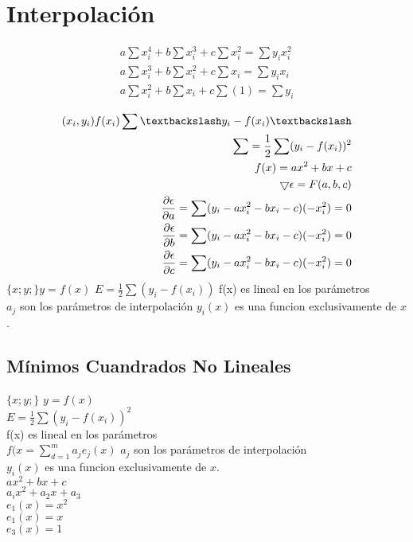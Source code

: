 \chapter{Interpolaci\'on}
\begin{eqnarray}
a\sum x_i^4 + b\sum x_i^3 + c\sum x_i^2 = \sum y_ix_i^2 \\
a\sum x_i^3 + b\sum x_i^2 + c\sum x_i = \sum y_ix_i\\ 
a\sum x_i^2 + b\sum x_i + c\sum(1) = \sum y_i
\end{eqnarray}

\begin{eqnarray}
(x_i , y_i) f(x_i) \sum \textbackslash y_i-f(x_i) \textbackslash \\
\sum = \frac{1}{2}\sum(y_i-f(x_i))^2\\
f(x) = ax^2+bx+c \\
\bigtriangledown \epsilon = F(a, b, c) \\
\frac{ \partial \epsilon}{\partial a} = \sum(y_i - ax_i^2 - bx_i - c)(-x_i^2) = 0\\
\frac{\partial \epsilon}{\partial b} = \sum(y_i - ax_i^2 - bx_i - c)(-x_i^2) = 0 \\
\frac{\partial \epsilon}{\partial c} = \sum(y_i - ax_i^2 - bx_i - c)(-x_i^2) = 0
\end{eqnarray} 
$\{x; y;\} y = f(x)$
$E=\frac{1}{2}\sum(y_i-f(x_i))$%
f(x) es lineal en los par\'ametros\\
$a_j$ son los par\'ametros de interpolaci\'on
$y_i(x)$ es una funcion exclusivamente de $x$.\\


\section{M\'inimos Cuandrados No Lineales}
\noindent $\{x; y;\}$ $y = f(x)$\\
$E=\frac{1}{2}\sum(y_i-f(x_i))^2$\\
f(x) es lineal en los par\'ametros\\
$f(x= \sum_{d=1}^{m}a_j e_j(x)$ %
$a_j$ son los par\'ametros de interpolaci\'on\\
$y_i(x)$ es una funcion exclusivamente de $x$.\\

\noindent $ax^2+bx+c$\\
$a_ix^2+a_2x +a_3$\\
$e_1(x)=x^2$\\
$e_1(x)=x$\\
$e_3(x)=1$\\

